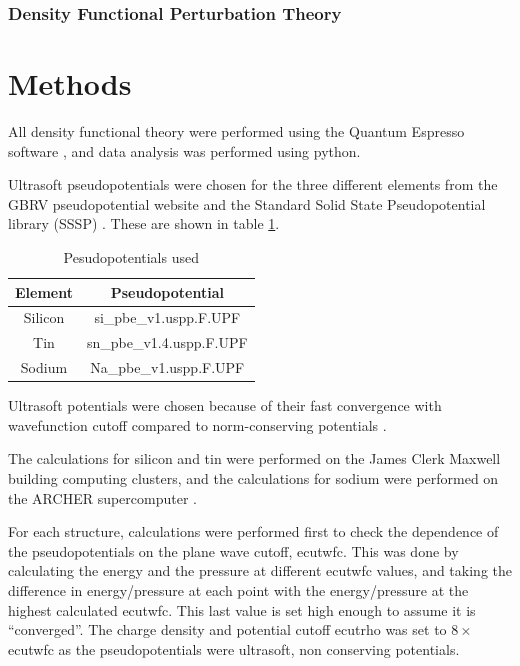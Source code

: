 \documentclass[12pt]{article}
\begin{document}
\subsubsection{Density Functional Perturbation Theory}

\section{Methods}
All density functional theory were performed using the Quantum Espresso software \cite{0953-8984-21-39-395502}, and data analysis was performed using python.

Ultrasoft pseudopotentials were chosen for the three different elements from the GBRV pseudopotential website \cite{rutgers} and the Standard Solid State Pseudopotential library (SSSP) \cite{SSSPwebsite}. 
These are shown in table \ref{tab:pseudopotentials}.
\begin{table}
\centering
	\begin{tabular}{|c|c|}
\hline
Element & Pseudopotential \\
\hline
Silicon & si\_pbe\_v1.uspp.F.UPF \cite{rutgers} \\
Tin & sn\_pbe\_v1.4.uspp.F.UPF \cite{rutgers} \\
Sodium & Na\_pbe\_v1.uspp.F.UPF \cite{SSSPwebsite} \\
\hline
\end{tabular}
\caption{Pesudopotentials used}
\label{tab:pseudopotentials}
\end{table}

Ultrasoft potentials were chosen because of their fast convergence with wavefunction cutoff compared to norm-conserving potentials \cite{vanderbilt1990soft}. 

The calculations for silicon and tin were performed on the James Clerk Maxwell building computing clusters, and the calculations for sodium were performed on the ARCHER supercomputer \cite{archer}.

For each structure, calculations were performed first to check the dependence of the pseudopotentials on the plane wave cutoff, ecutwfc. This was done by calculating the energy and the pressure at different ecutwfc values, and taking the difference in energy/pressure at each point with the energy/pressure at the highest calculated ecutwfc. This last value is set high enough to assume it is ``converged''. 
The charge density and potential cutoff ecutrho was set to $8\times$ ecutwfc as the pseudopotentials were ultrasoft, non conserving potentials.
\end{document}
